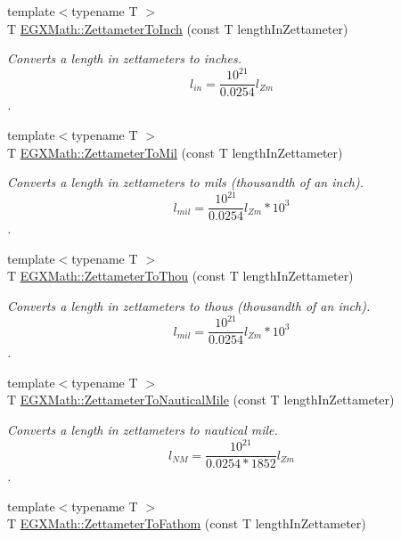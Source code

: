 \begin{DoxyCompactItemize}
{\footnotesize template$<$typename T $>$ }\\T \mbox{\hyperlink{group___e_g_x_math-_conversions-_length_conversions-_s_i-_zettameter-_imperial_gada0a88ddbf198ca1828b6c39fda34f2c}{E\+G\+X\+Math\+::\+Zettameter\+To\+Inch}} (const T length\+In\+Zettameter)
\begin{DoxyCompactList}\small\item\em Converts a length in zettameters to inches. \[ l_{in}= \frac{10^{21}}{0.0254} l_{Zm} \]. \end{DoxyCompactList}\item 
{\footnotesize template$<$typename T $>$ }\\T \mbox{\hyperlink{group___e_g_x_math-_conversions-_length_conversions-_s_i-_zettameter-_imperial_gad42b99391f53e56136f2411915c5e28d}{E\+G\+X\+Math\+::\+Zettameter\+To\+Mil}} (const T length\+In\+Zettameter)
\begin{DoxyCompactList}\small\item\em Converts a length in zettameters to mils (thousandth of an inch). \[ l_{mil}= \frac{10^{21}}{0.0254} l_{Zm} * 10^{3} \]. \end{DoxyCompactList}\item 
{\footnotesize template$<$typename T $>$ }\\T \mbox{\hyperlink{group___e_g_x_math-_conversions-_length_conversions-_s_i-_zettameter-_imperial_gacd92ac6ab3300ca582966510e369a381}{E\+G\+X\+Math\+::\+Zettameter\+To\+Thou}} (const T length\+In\+Zettameter)
\begin{DoxyCompactList}\small\item\em Converts a length in zettameters to thous (thousandth of an inch). \[ l_{mil}= \frac{10^{21}}{0.0254} l_{Zm} * 10^{3} \]. \end{DoxyCompactList}\item 
{\footnotesize template$<$typename T $>$ }\\T \mbox{\hyperlink{group___e_g_x_math-_conversions-_length_conversions-_s_i-_zettameter-_nautical_ga474eb2cb88740b3dd9e13fa6e8aa4558}{E\+G\+X\+Math\+::\+Zettameter\+To\+Nautical\+Mile}} (const T length\+In\+Zettameter)
\begin{DoxyCompactList}\small\item\em Converts a length in zettameters to nautical mile. \[ l_{NM}= \frac{10^{21}}{0.0254 * 1852} l_{Zm} \]. \end{DoxyCompactList}\item 
{\footnotesize template$<$typename T $>$ }\\T \mbox{\hyperlink{group___e_g_x_math-_conversions-_length_conversions-_s_i-_zettameter-_nautical_ga44aa79d0db3ed37a2e2f4800467008c2}{E\+G\+X\+Math\+::\+Zettameter\+To\+Fathom}} (const T length\+In\+Zettameter)

\end{DoxyCompactItemize}
